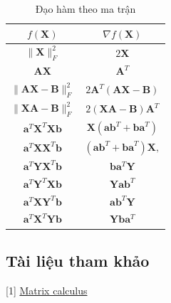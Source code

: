 \documentclass[12pt]{article}
\begin{document}
 \begin{table}[h!]
\centering
\caption{Đạo hàm theo ma trận}
\label{my-label}
\begin{tabular}{|c|c|}
\hline
$f(\mathbf{X}) $                                   & $ \nabla f(\mathbf{X}) $                      \\ \hline
$ \|\mathbf{X}\|_F^2$ & $2\mathbf{X}$ \\\hline
$ \mathbf{AX}$ & $\mathbf{A}^T$ \\\hline
$ \|\mathbf{AX - B}\|_F^2$ & $2\mathbf{A}^T(\mathbf{AX - B})$ \\\hline
$ \|\mathbf{XA - B}\|_F^2$ & $2(\mathbf{XA-B})\mathbf{A}^T$ \\\hline
$ \mathbf{a}^T \mathbf{X}^T \mathbf{Xb}$           & $ \mathbf{X}(\mathbf{ab}^T + \mathbf{ba}^T)$ \\ \hline
$ \mathbf{a}^T \mathbf{X} \mathbf{X}^T \mathbf{b}$ & $ (\mathbf{ab}^T + \mathbf{ba}^T)\mathbf{X},$ \\ \hline
$ \mathbf{a}^T \mathbf{Y} \mathbf{X}^T \mathbf{b}$ & $ \mathbf{b}\mathbf{a}^T \mathbf{Y}$         \\ \hline
$ \mathbf{a}^T \mathbf{Y}^T \mathbf{X} \mathbf{b}$ & $ \mathbf{Y}\mathbf{a}\mathbf{b}^T$          \\ \hline
$ \mathbf{a}^T \mathbf{X} \mathbf{Y}^T \mathbf{b}$ & $ \mathbf{a}\mathbf{b}^T\mathbf{Y}$          \\ \hline
$ \mathbf{a}^T \mathbf{X}^T \mathbf{Y} \mathbf{b}$ & $ \mathbf{Y}\mathbf{b}\mathbf{a}^T$          \\ \hline
\end{tabular}
\end{table}


\subsection{Tài liệu tham khảo }
[1] \href{https://ccrma.stanford.edu/~dattorro/matrixcalc.pdf}{Matrix calculus} 
 
 
 
\end{document}
